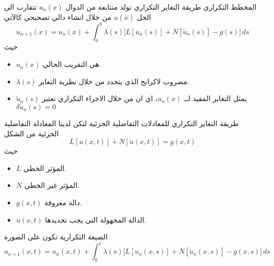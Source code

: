 	\begin{frame}
		\begin{exampleblock}{المخطط التكراري}
			طريقة التغاير التكراري تولد متتابعة من الدوال $u_n(x)$ تتقارب الى الحل $u(x)$ من خلال انشاء دالي تصحيحي كالآتي
			\[
			u_{n+1}(x) = u_n(x) + \int_a^b \lambda(s) \big[L[u_n(s)] + N[\tilde{u}_n(s)] - g(s)\big] \, ds
			\]
			حيث
			\begin{itemize}
				\item $u_n(x)$ هي التقريب الحالي.
				\item $\lambda(s)$ مضروب لاكرانج الذي يتحدد من خلال نظرية التغاير.
				\item $\tilde{u}_n(s)$ يمثل التغاير المقيد لــ $u_n(x)$، اي ان من خلال الاجراء التكراري نعتبر $\delta\tilde{u}_n(s) = 0$
			\end{itemize}
		\end{exampleblock}
	\end{frame}
	
	\begin{frame}
		
		\begin{exampleblock}{طريقة التغاير التكراري للمعادلات التفاضلية الجزئية}
			لتكن لدينا المعادلة التفاضلية الجزئية من الشكل
			\[
			L[u(x, t)] + N[u(x, t)] = g(x, t)
			\]
			حيث
			\begin{itemize}
				\item $L$ المؤثر الخطي.
				\item $N$ المؤثر غير الخطي.
				\item $g(x, t)$ دالة معروفة.
				\item $u(x, t)$ الدالة المجهولة التي يجب تحديدها.
			\end{itemize}
			الصيغة التكرارية تكون على الصورة
			\begin{equation}
				u_{n+1}(x, t) = u_n(x, t) + \int_{0}^{t} \lambda(s) \big[L[u_n(x, s)] + N[\tilde{u}_n(x, s)] - g(x, s)\big] \, ds 
			\end{equation}
		\end{exampleblock}
	\end{frame}
	
